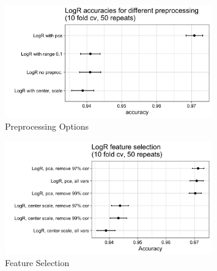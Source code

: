\documentclass[]{article}
\begin{document}
\begin{figure}
    \centering
    \includegraphics[width=0.8\textwidth]{images/M1-preprocessing-options.png}
    \caption{Preprocessing Options}
    \label{fig:preprocessing}
\end{figure}

\begin{figure}
    \centering
    \includegraphics[width=0.8\textwidth]{images/M2-feature-selection.png}
    \caption{Feature Selection}
    \label{fig:feature-selection}
\end{figure}

\renewcommand\refname{References}

\end{document}
